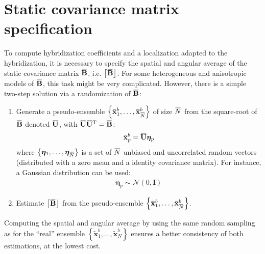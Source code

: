 \documentclass[12pt]{scrartcl}
\newcommand{\overbar}[1]{\mkern 1.5mu\overline{\mkern-1.5mu#1\mkern-1.5mu}\mkern 1.5mu}
\begin{document}
\clearpage

\section{Static covariance matrix specification}
To compute hybridization coefficients and a localization adapted to the hybridization, it is necessary to specify the spatial and angular average of the static covariance matrix $\overbar{\mathbf{B}}$, i.e. $\left\lceil \overbar{\mathbf{B}} \right\rfloor$. For some heterogeneous and anisotropic models of $\overbar{\mathbf{B}}$, this task might be very complicated. However, there is a simple two-step solution via a randomization of $\overbar{\mathbf{B}}$:
\begin{enumerate}
\item Generate a pseudo-ensemble $\left\{\overbar{\mathbf{x}}^b_1,\dots,\overbar{\mathbf{x}}^b_{\overbar{N}}\right\}$ of size $\overbar{N}$ from the square-root of $\overbar{\mathbf{B}}$ denoted $\overbar{\mathbf{U}}$, with $\overbar{\mathbf{U}} \overbar{\mathbf{U}}^\mathrm{T} = \overbar{\mathbf{B}}$:
\begin{align}
\overbar{\mathbf{x}}^b_p = \overbar{\mathbf{U}} \boldsymbol{\eta}_p
\end{align}
where $\left\{\boldsymbol{\eta}_1,\dots,\boldsymbol{\eta}_{\overbar{N}}\right\}$ is a set of $\overbar{N}$ unbiased and uncorrelated random vectors (distributed with a zero mean and a identity covariance matrix). For instance, a Gaussian distribution can be used:
\begin{align}
\boldsymbol{\eta}_p \sim \mathcal{N}\left(0,\mathbf{I}\right)
\end{align}
\item Estimate $\left\lceil \overbar{\mathbf{B}} \right\rfloor$ from the pseudo-ensemble $\left\{\overbar{\mathbf{x}}^b_1,\dots,\overbar{\mathbf{x}}^b_{\overbar{N}}\right\}$.
\end{enumerate}
Computing the spatial and angular average by using the same random sampling as for the ``real'' ensemble $\left\{\widetilde{\mathbf{x}}^b_1,\dots,\widetilde{\mathbf{x}}^b_N\right\}$ ensures a better consistency of both estimations, at the lowest cost.

\clearpage



\end{document}
